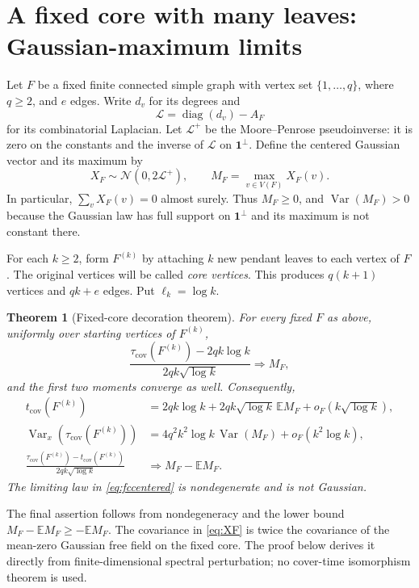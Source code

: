 \documentclass[11pt]{amsart}
\newtheorem{theorem}{Theorem}[section]
\theoremstyle{remark}
\numberwithin{equation}{section}
\DeclareMathOperator{\Var}{Var}
\DeclareMathOperator{\diag}{diag}
\newcommand{\E}{\mathbb{E}}
\newcommand{\tcov}{t_{\mathrm{cov}}}
\newcommand{\taucov}{\tau_{\mathrm{cov}}}
\newcommand{\bone}{\mathbf{1}}
\newcommand{\Lap}{\mathcal{L}}
\newcommand{\Nor}{\mathcal{N}}
\begin{document}
\section{A fixed core with many leaves: Gaussian-maximum limits}\label{sec:fixedcore}

Let $F$ be a fixed finite connected simple graph with vertex set $\{1,\dots,q\}$, where $q\ge 2$, and $e$ edges. Write $d_v$ for its degrees and
\[
\Lap=\diag(d_v)-A_F
\]
for its combinatorial Laplacian. Let $\Lap^+$ be the Moore--Penrose pseudoinverse: it is zero on the constants and the inverse of $\Lap$ on $\bone^\perp$. Define the centered Gaussian vector and its maximum by
\begin{equation}\label{eq:XF}
X_F\sim\Nor(0,2\Lap^+),\qquad M_F=\max_{v\in V(F)}X_F(v).
\end{equation}
In particular, $\sum_vX_F(v)=0$ almost surely. Thus $M_F\ge 0$, and $\Var(M_F)>0$ because the Gaussian law has full support on $\bone^\perp$ and its maximum is not constant there.

For each $k\ge 2$, form $F^{(k)}$ by attaching $k$ new pendant leaves to each vertex of $F$. The original vertices will be called \emph{core vertices}. This produces $q(k+1)$ vertices and $qk+e$ edges. Put $\ell_k=\log k$.

\begin{theorem}[Fixed-core decoration theorem]\label{thm:fixedcore}
For every fixed $F$ as above, uniformly over starting vertices of $F^{(k)}$,
\begin{equation}\label{eq:fclimit}
\frac{\taucov(F^{(k)})-2qk\log k}{2qk\sqrt{\log k}}\Longrightarrow M_F,
\end{equation}
and the first two moments converge as well. Consequently,
\begin{align}
\tcov(F^{(k)})&=2qk\log k+2qk\sqrt{\log k}\,\E M_F+o_F(k\sqrt{\log k}),\label{eq:fcmean}\\
\Var_x(\taucov(F^{(k)}))&=4q^2k^2\log k\,\Var(M_F)+o_F(k^2\log k),\label{eq:fcvar}\\
\frac{\taucov(F^{(k)})-\tcov(F^{(k)})}{2qk\sqrt{\log k}}&\Longrightarrow M_F-\E M_F.\label{eq:fccentered}
\end{align}
The limiting law in \eqref{eq:fccentered} is nondegenerate and is not Gaussian.
\end{theorem}

The final assertion follows from nondegeneracy and the lower bound $M_F-\E M_F\ge-\E M_F$. The covariance in \eqref{eq:XF} is twice the covariance of the mean-zero Gaussian free field on the fixed core. The proof below derives it directly from finite-dimensional spectral perturbation; no cover-time isomorphism theorem is used.
\end{document}
